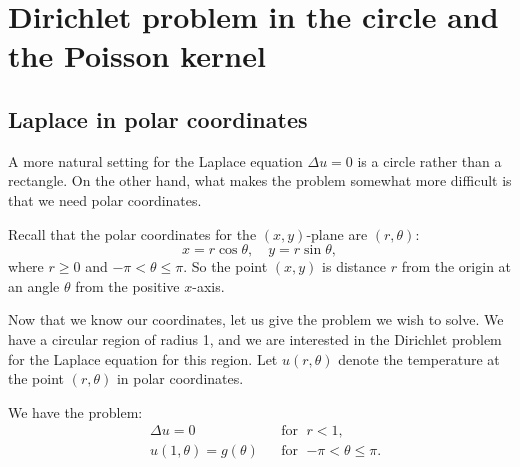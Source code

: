 
\sectionnewpage
\section{Dirichlet problem in the circle and the Poisson kernel}
\label{dirichdisc:section}



\subsection{Laplace in polar coordinates}

A more natural setting for the Laplace equation $\Delta u = 0$
is a circle rather than a rectangle.  On the other hand, what makes the
problem somewhat more difficult is that we need polar coordinates.

\begin{mywrapfigsimp}[5]{1.3in}{1.5in}
\diffypdfversion{\vspace*{5pt}}
\noindent
{}
\diffypdfversion{\vspace*{5pt}}
\end{mywrapfigsimp}
Recall that the polar coordinates for the $(x,y)$-plane are $(r,\theta)$: 
\begin{equation*}
x = r \cos \theta , \quad y = r \sin \theta ,
\end{equation*}
where $r \geq 0$ and $-\pi < \theta \leq \pi$.  So the point $(x,y)$ is
distance $r$ from the origin at an angle $\theta$ from the positive
$x$-axis.

Now that we know our coordinates, let us give the problem we wish
to solve.  We have a circular region of radius 1, and we are interested
in the Dirichlet problem for the Laplace equation for this region.  Let
$u(r,\theta)$ denote the temperature at the point $(r,\theta)$ in polar
coordinates.

\begin{mywrapfigsimp}{2.4in}{2.7in}
\noindent
{}
\end{mywrapfigsimp}
We have the problem:
\begin{equation} \label{dirichdisc:theprobeq}
\begin{aligned}
& \Delta u = 0  & & \text{for } \; r < 1, \\
& u(1,\theta) = g(\theta) & & \text{for } \; {-\pi} < \theta \leq \pi.
\end{aligned}
\end{equation}

